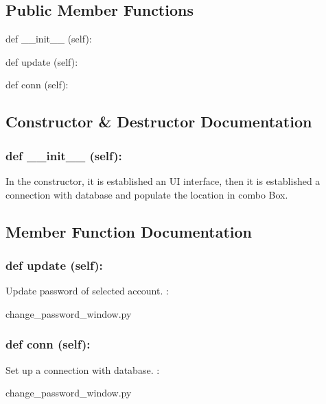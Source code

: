 \subsection*{Public Member Functions}
\begin{DoxyCompactItemize}
\item 
def {\_\_init\_\_} (self):
\item 
def {update} (self):
\item 
def {conn} (self):
\end{DoxyCompactItemize}

\subsection{Constructor \& Destructor Documentation}
\hypertarget{class_poly_aa3def076b74bed67904976ad4f9fe9b1}{
\subsubsection[{def __init__ (self):}]{\setlength{\rightskip}{0pt plus 5cm}def {\_\_init\_\_} (self): 
}}
In the constructor, it is established an UI interface, then it is  established a connection with database and populate the location in combo Box.
 

\subsection{Member Function Documentation}
\hypertarget{class_poly_a14a7ad77ce612b0c54f531d307ee4b39}{
\subsubsection[{def update (self):}]{\setlength{\rightskip}{0pt plus 5cm}def {update} (self):}}\label{class_poly_a14a7ad77ce612b0c54f531d307ee4b39}
Update password of selected account.
:\begin{DoxyCompactItemize}
\item 
change\_password\_window.\-py\end{DoxyCompactItemize}

\hypertarget{class_poly_a14a7ad77ce612b0c54f531d307ee4b39}{
\subsubsection[{def conn (self):}]{\setlength{\rightskip}{0pt plus 5cm}def {conn} (self):}}\label{class_poly_a14a7ad77ce612b0c54f531d307ee4b39}
Set up a connection with database.
:\begin{DoxyCompactItemize}
\item 
change\_password\_window.\-py\end{DoxyCompactItemize}


